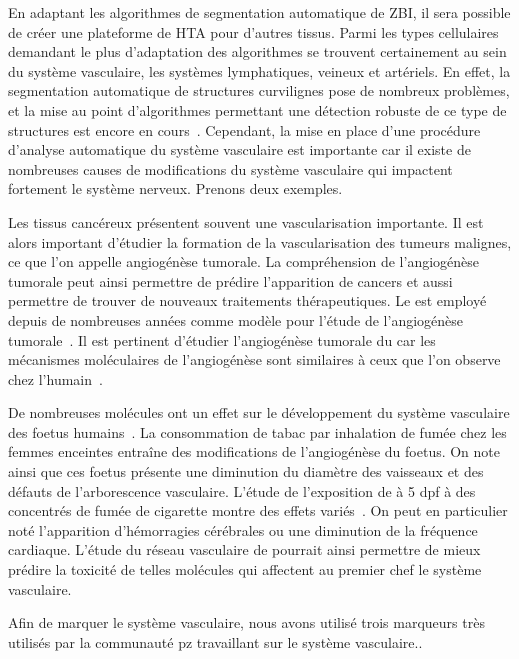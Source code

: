 \documentclass[\main/main.tex]{subfiles}
\begin{document}
%
En adaptant les algorithmes de segmentation automatique de ZBI,
il sera possible de créer une plateforme de HTA pour d'autres tissus.
Parmi les types cellulaires demandant le plus d'adaptation des algorithmes se trouvent certainement au sein du système vasculaire, les systèmes lymphatiques, veineux et artériels.
%
En effet,
la segmentation automatique de structures curvilignes pose de nombreux problèmes,
et la mise au point d'algorithmes permettant une détection robuste de ce type de
structures est encore en cours~\cite{merveille_2019,mosinska_2020,mou_2019}.
%
Cependant, la mise en place d'une procédure d'analyse automatique du système vasculaire est importante car il existe de nombreuses causes de modifications du système vasculaire qui impactent fortement le système nerveux.
%
Prenons deux exemples.

%
Les tissus cancéreux présentent souvent une vascularisation importante.
%
Il est alors important d'étudier la formation de la vascularisation des tumeurs malignes, ce que l'on appelle angiogénèse tumorale.
%
La compréhension de l'angiogénèse tumorale peut ainsi permettre de prédire
l'apparition de cancers et aussi permettre de trouver de nouveaux traitements
thérapeutiques.
%
Le \pz{} est employé depuis de nombreuses années comme modèle pour l'étude de l'angiogénèse tumorale~\cite{nicoli_2007,guerra_2020,letrado_2018}.
%
Il est pertinent d'étudier l'angiogénèse tumorale du \pz{} car les mécanismes moléculaires de l'angiogénèse sont similaires à ceux que l'on observe chez l'humain~\cite{tobia_2011}.

%
De nombreuses molécules ont un effet sur le développement du système vasculaire des foetus humains~\cite{knudsen_2011}.
%
La consommation de tabac par inhalation de fumée chez les femmes enceintes
entraîne des modifications de l'angiogénèse du foetus.
%
On note ainsi que ces foetus présente une diminution du diamètre des vaisseaux
et des défauts de l'arborescence vasculaire.
%
L'étude de l'exposition de \pz{} à 5 dpf à des concentrés de fumée de cigarette
montre des effets variés~\cite{ellis_2014,massarsky_2018}.
%
On peut en particulier noté l'apparition d'hémorragies cérébrales ou une diminution de la fréquence cardiaque.
%
L'étude du réseau vasculaire de \pz{} pourrait ainsi permettre de mieux prédire la toxicité de telles molécules qui affectent au premier chef le système vasculaire.%

%
Afin de marquer le système vasculaire, nous avons utilisé trois marqueurs très utilisés par la communauté pz travaillant sur le système vasculaire..
%
\end{document}
